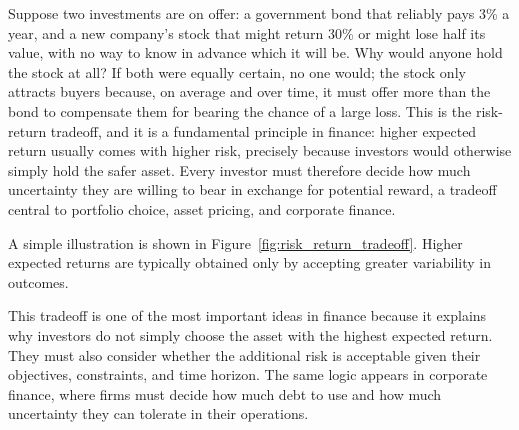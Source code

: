 \documentclass[../ai_in_finance]{subfiles}
\begin{document}
Suppose two investments are on offer: a government bond that reliably pays 3\% a year, and a new company's stock that might return 30\% or might lose half its value, with no way to know in advance which it will be. Why would anyone hold the stock at all? If both were equally certain, no one would; the stock only attracts buyers because, on average and over time, it must offer more than the bond to compensate them for bearing the chance of a large loss. This is the risk-return tradeoff, and it is a fundamental principle in finance: higher expected return usually comes with higher risk, precisely because investors would otherwise simply hold the safer asset. Every investor must therefore decide how much uncertainty they are willing to bear in exchange for potential reward, a tradeoff central to portfolio choice, asset pricing, and corporate finance.

A simple illustration is shown in Figure~\ref{fig:risk_return_tradeoff}. Higher expected returns are typically obtained only by accepting greater variability in outcomes.

This tradeoff is one of the most important ideas in finance because it explains why investors do not simply choose the asset with the highest expected return. They must also consider whether the additional risk is acceptable given their objectives, constraints, and time horizon. The same logic appears in corporate finance, where firms must decide how much debt to use and how much uncertainty they can tolerate in their operations.

\begin{figure}[htbp]
\centering
\begin{lrbox}{\bookmeasuredbox}
\end{lrbox}
\ifdim\wd\bookmeasuredbox<0.65\linewidth
\setlength{\bookcapwidth}{0.65\linewidth}
\else
\setlength{\bookcapwidth}{\wd\bookmeasuredbox}
\fi
{}
\end{figure}
\end{document}
